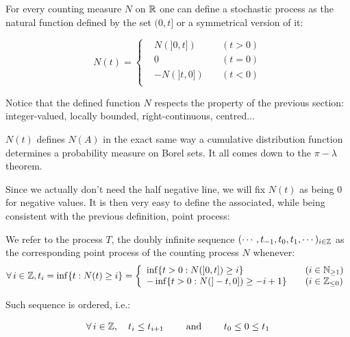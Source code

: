 \documentclass[11pt]{book}
\begin{document}
\begin{definition}
For every counting measure $N$ on $\mathbb{R}$ one can define a stochastic process as the natural function defined by the set $(0,t]$ or a symmetrical version of it:

$$N(t) = \left\{
    \begin{array}{lll}
         &N \left ( ]0,t] \right ) \quad &(t > 0)  \\
         &0 \quad &(t= 0)   \\
         &- N \left ( ]t,0] \right ) \quad &(t < 0) \\
    \end{array}
\right. $$
\end{definition}


Notice that the defined function $N$ respects the property of the previous section: integer-valued, locally bounded, right-continuous, centred...

\begin{remarque}
$N(t)$ defines $N(A)$ in the exact same way a cumulative distribution function determines a probability measure on Borel sets. It all comes down to the $ \pi - \lambda $ theorem.
\end{remarque}

Since we actually don't need the half negative line, we will fix $N(t)$ as being $0$ for negative values. It is then very easy to define the associated, while being consistent with the previous definition, point process:

\begin{definition}
We refer to the process $T$, the doubly infinite sequence $( \cdots, t_{-1}, t_0, t_1, \cdots)_{i \in \mathbb{Z}}$ as the corresponding point process of the counting process $N$ whenever:
\begin{equation}
\forall i \in \Z, t_i = \inf \{ t : N(t) \geq i \} = \left\{
    \begin{array}{ll}
           \inf \{ t > 0 : N( ]0,t] ) \geq i \} \quad &( i \in \mathbb N_{\geq 1})  \\
          - \inf \{ t > 0 : N( ]-t, 0] ) \geq -i+1 \} \quad &(i \in \mathbb Z_{\leq 0}) \\
    \end{array}
\right. 
\end{equation}
\end{definition}

Such sequence is ordered, i.e.:

$$ \forall i \in \Z, \quad t_i \leq t_{i+1} \qquad \text{ and } \qquad t_0 \leq 0 \leq t_1 $$
\end{document}
